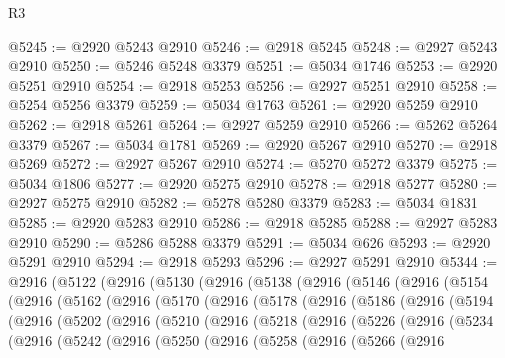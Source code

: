 \begin{lexlean}{R3}
\begin{coremodule}
@5245 := @2920 @5243 @2910
@5246 := @2918 @5245
@5248 := @2927 @5243 @2910
@5250 := @5246 @5248 @3379
@5251 := @5034 @1746
@5253 := @2920 @5251 @2910
@5254 := @2918 @5253
@5256 := @2927 @5251 @2910
@5258 := @5254 @5256 @3379
@5259 := @5034 @1763
@5261 := @2920 @5259 @2910
@5262 := @2918 @5261
@5264 := @2927 @5259 @2910
@5266 := @5262 @5264 @3379
@5267 := @5034 @1781
@5269 := @2920 @5267 @2910
@5270 := @2918 @5269
@5272 := @2927 @5267 @2910
@5274 := @5270 @5272 @3379
@5275 := @5034 @1806
@5277 := @2920 @5275 @2910
@5278 := @2918 @5277
@5280 := @2927 @5275 @2910
@5282 := @5278 @5280 @3379
@5283 := @5034 @1831
@5285 := @2920 @5283 @2910
@5286 := @2918 @5285
@5288 := @2927 @5283 @2910
@5290 := @5286 @5288 @3379
@5291 := @5034 @626
@5293 := @2920 @5291 @2910
@5294 := @2918 @5293
@5296 := @2927 @5291 @2910
@5344 := @2916
    (@5122
      (@2916
        (@5130
          (@2916
            (@5138
              (@2916
                (@5146
                  (@2916
                    (@5154
                      (@2916
                        (@5162
                          (@2916
                            (@5170
                              (@2916
                                (@5178
                                  (@2916
                                    (@5186
                                      (@2916
                                        (@5194
                                          (@2916
                                            (@5202
                                              (@2916
                                                (@5210
                                                  (@2916
                                                    (@5218
                                                      (@2916
                                                        (@5226
                                                          (@2916
                                                            (@5234
                                                              (@2916
                                                                (@5242
                                                                  (@2916
                                                                    (@5250
                                                                      (@2916
                                                                        (@5258
                                                                          (@2916
                                                                            (@5266
                                                                              (@2916

\end{coremodule}
\end{lexlean}
